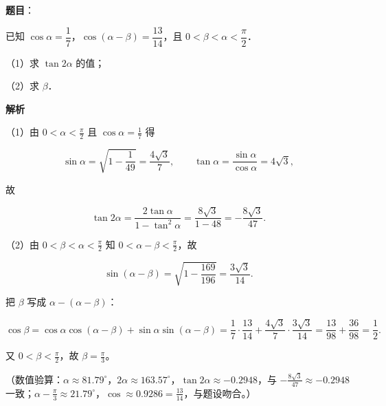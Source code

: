 \begin{answer}

\textbf{题目}：

已知 $\cos\alpha=\dfrac17$，$\cos(\alpha-\beta)=\dfrac{13}{14}$，且 $0<\beta<\alpha<\dfrac{\pi}{2}$．

（1）求 $\tan2\alpha$ 的值；

（2）求 $\beta$．

\textbf{解析}

（1）由 $0<\alpha<\frac{\pi}{2}$ 且 $\cos\alpha=\frac17$ 得

\nopagebreak[4]
\[\sin\alpha=\sqrt{1-\frac1{49}}=\frac{4\sqrt3}{7},\qquad \tan\alpha=\frac{\sin\alpha}{\cos\alpha}=4\sqrt3,\]

故

\nopagebreak[4]
\[\tan2\alpha=\frac{2\tan\alpha}{1-\tan^{2}\alpha}=\frac{8\sqrt3}{1-48}=-\frac{8\sqrt3}{47}.\]

（2）由 $0<\beta<\alpha<\frac{\pi}{2}$ 知 $0<\alpha-\beta<\frac{\pi}{2}$，故

\nopagebreak[4]
\[\sin(\alpha-\beta)=\sqrt{1-\frac{169}{196}}=\frac{3\sqrt3}{14}.\]

把 $\beta$ 写成 $\alpha-(\alpha-\beta)$：

\nopagebreak[4]
\[\cos\beta=\cos\alpha\cos(\alpha-\beta)+\sin\alpha\sin(\alpha-\beta)=\frac17\cdot\frac{13}{14}+\frac{4\sqrt3}{7}\cdot\frac{3\sqrt3}{14}=\frac{13}{98}+\frac{36}{98}=\frac12 .\]

又 $0<\beta<\frac{\pi}{2}$，故 $\beta=\frac{\pi}{3}$。

（数值验算：$\alpha\approx81.79^\circ$，$2\alpha\approx163.57^\circ$，$\tan2\alpha\approx-0.2948$，与 $-\frac{8\sqrt3}{47}\approx-0.2948$ 一致；$\alpha-\frac{\pi}{3}\approx21.79^\circ$，$\cos\approx0.9286=\frac{13}{14}$，与题设吻合。）


\end{answer}

